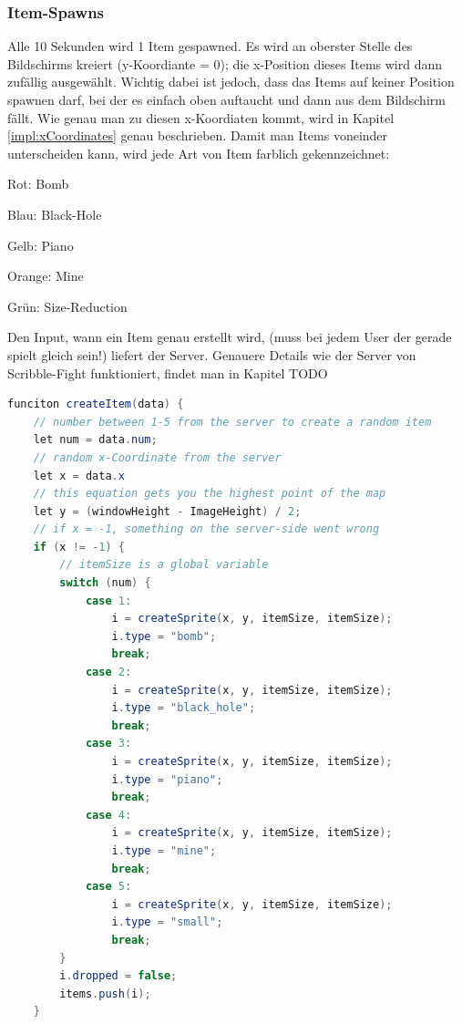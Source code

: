 \subsubsection{Item-Spawns}
Alle 10 Sekunden wird 1 Item gespawned.
Es wird an oberster Stelle des Bildschirms kreiert (y-Koordiante = 0); die x-Position dieses Items wird dann zufällig ausgewählt. 
Wichtig dabei ist jedoch, dass das Items auf keiner Position spawnen darf, bei der es einfach oben auftaucht und dann aus dem Bildschirm fällt.
Wie genau man zu diesen x-Koordiaten kommt, wird in Kapitel \ref{impl:xCoordinates} genau beschrieben. 
Damit man Items voneinder unterscheiden kann, wird jede Art von Item farblich gekennzeichnet:

\begin{compactitem}
    \item Rot: Bomb
    \item Blau: Black-Hole
    \item Gelb: Piano
    \item Orange: Mine
    \item Grün: Size-Reduction
\end{compactitem}

Den Input, wann ein Item genau erstellt wird, (muss bei jedem User der gerade spielt gleich sein!) liefert der Server. Genauere Details wie der Server von Scribble-Fight funktioniert, findet man in Kapitel TODO
\\

\begin{lstlisting}[caption=Erstellen eines Items,language=Java,label=lst:impl:createItem]
funciton createItem(data) {
    // number between 1-5 from the server to create a random item
    let num = data.num;
    // random x-Coordinate from the server
    let x = data.x
    // this equation gets you the highest point of the map
    let y = (windowHeight - ImageHeight) / 2;
    // if x = -1, something on the server-side went wrong
    if (x != -1) {
        // itemSize is a global variable
        switch (num) {
            case 1:
                i = createSprite(x, y, itemSize, itemSize);
                i.type = "bomb";
                break;
            case 2:
                i = createSprite(x, y, itemSize, itemSize);
                i.type = "black_hole";
                break;
            case 3:
                i = createSprite(x, y, itemSize, itemSize);
                i.type = "piano";
                break;
            case 4:
                i = createSprite(x, y, itemSize, itemSize);
                i.type = "mine";
                break;
            case 5:
                i = createSprite(x, y, itemSize, itemSize);
                i.type = "small";
                break;
        }
        i.dropped = false;
        items.push(i);
    }
\end{lstlisting}

